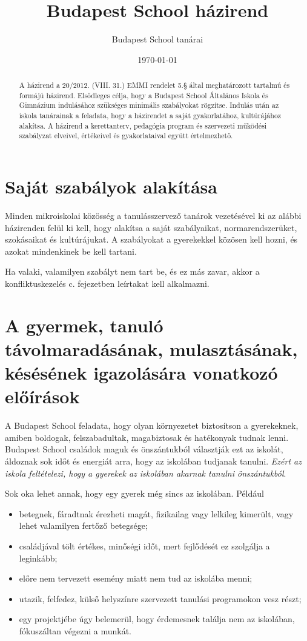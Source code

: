 \documentclass{article}
\title{Budapest School házirend}
\author{Budapest School tanárai}
\date{\today}
\begin{document}
\maketitle

\tableofcontents
\pagebreak
\begin{abstract}
    A házirend a 20/2012. (VIII. 31.) EMMI rendelet 5.§ által meghatározott tartalmú és formájú házirend. Elsődleges célja, hogy a Budapest School Általános Iskola és Gimnázium indulásához szükséges minimális szabályokat rögzítse. Indulás után az iskola tanárainak a feladata, hogy a házirendet a saját gyakorlatához, kultúrájához alakítsa. A házirend a kerettanterv, pedagógia program és szervezeti működési szabályzat elveivel, értékeivel és gyakorlataival együtt értelmezhető. 
    \end{abstract}


     

\section{Saját szabályok alakítása}
Minden mikroiskolai közösség a tanulásszervező tanárok vezetésével ki  az alábbi házirenden felül ki kell, hogy alakítsa a saját szabályaikat, normarendszerüket, szokásaikat és kultúrájukat. A szabályokat a gyerekekkel közösen kell hozni, és azokat mindenkinek be kell tartani.

Ha valaki, valamilyen szabályt nem tart be, és ez más zavar, akkor a konfliktuskezelés c. fejezetben leírtakat kell alkalmazni.


\section{A gyermek, tanuló távolmaradásának, mulasztásának, késésének igazolására vonatkozó előírások}

A Budapest School feladata, hogy olyan környezetet biztosítson a gyerekeknek, amiben boldogak, felszabadultak, magabiztosak és hatékonyak tudnak lenni. Budapest School családok maguk és önszántukból választják ezt az iskolát, áldoznak sok időt és energiát arra, hogy az iskolában tudjanak tanulni. \emph{Ezért az iskola feltételezi, hogy a gyerekek az iskolában akarnak tanulni önszántukból}.

Sok oka lehet annak, hogy egy gyerek még sincs az iskolában. Például
\begin{itemize}
    \item betegnek, fáradtnak érezheti magát, fizikailag vagy lelkileg kimerült, vagy lehet valamilyen fertőző betegsége;
    \item családjával tölt értékes, minőségi időt, mert fejlődését ez szolgálja a leginkább;
    \item előre nem tervezett esemény miatt nem tud az iskolába menni;
    \item utazik, felfedez, külső helyszínre szervezett tanulási programokon vesz részt;
    \item egy projektjébe úgy belemerül, hogy érdemesnek találja nem az iskolában, fóku\-száltan végezni a munkát.
 \end{itemize}
\end{document}
